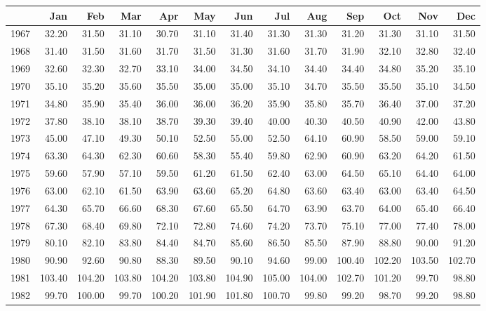 \begin{longtable}{rrrrrrrrrrrrr}
  \hline
 & Jan & Feb & Mar & Apr & May & Jun & Jul & Aug & Sep & Oct & Nov & Dec \\ 
  \hline
1967 & 32.20 & 31.50 & 31.10 & 30.70 & 31.10 & 31.40 & 31.30 & 31.30 & 31.20 & 31.30 & 31.10 & 31.50 \\ 
  1968 & 31.40 & 31.50 & 31.60 & 31.70 & 31.50 & 31.30 & 31.60 & 31.70 & 31.90 & 32.10 & 32.80 & 32.40 \\ 
  1969 & 32.60 & 32.30 & 32.70 & 33.10 & 34.00 & 34.50 & 34.10 & 34.40 & 34.40 & 34.80 & 35.20 & 35.10 \\ 
  1970 & 35.10 & 35.20 & 35.60 & 35.50 & 35.00 & 35.00 & 35.10 & 34.70 & 35.50 & 35.50 & 35.10 & 34.50 \\ 
  1971 & 34.80 & 35.90 & 35.40 & 36.00 & 36.00 & 36.20 & 35.90 & 35.80 & 35.70 & 36.40 & 37.00 & 37.20 \\ 
  1972 & 37.80 & 38.10 & 38.10 & 38.70 & 39.30 & 39.40 & 40.00 & 40.30 & 40.50 & 40.90 & 42.00 & 43.80 \\ 
  1973 & 45.00 & 47.10 & 49.30 & 50.10 & 52.50 & 55.00 & 52.50 & 64.10 & 60.90 & 58.50 & 59.00 & 59.10 \\ 
  1974 & 63.30 & 64.30 & 62.30 & 60.60 & 58.30 & 55.40 & 59.80 & 62.90 & 60.90 & 63.20 & 64.20 & 61.50 \\ 
  1975 & 59.60 & 57.90 & 57.10 & 59.50 & 61.20 & 61.50 & 62.40 & 63.00 & 64.50 & 65.10 & 64.40 & 64.00 \\ 
  1976 & 63.00 & 62.10 & 61.50 & 63.90 & 63.60 & 65.20 & 64.80 & 63.60 & 63.40 & 63.00 & 63.40 & 64.50 \\ 
  1977 & 64.30 & 65.70 & 66.60 & 68.30 & 67.60 & 65.50 & 64.70 & 63.90 & 63.70 & 64.00 & 65.40 & 66.40 \\ 
  1978 & 67.30 & 68.40 & 69.80 & 72.10 & 72.80 & 74.60 & 74.20 & 73.70 & 75.10 & 77.00 & 77.40 & 78.00 \\ 
  1979 & 80.10 & 82.10 & 83.80 & 84.40 & 84.70 & 85.60 & 86.50 & 85.50 & 87.90 & 88.80 & 90.00 & 91.20 \\ 
  1980 & 90.90 & 92.60 & 90.80 & 88.30 & 89.50 & 90.10 & 94.60 & 99.00 & 100.40 & 102.20 & 103.50 & 102.70 \\ 
  1981 & 103.40 & 104.20 & 103.80 & 104.20 & 103.80 & 104.90 & 105.00 & 104.00 & 102.70 & 101.20 & 99.70 & 98.80 \\ 
  1982 & 99.70 & 100.00 & 99.70 & 100.20 & 101.90 & 101.80 & 100.70 & 99.80 & 99.20 & 98.70 & 99.20 & 98.80 \\ 

\end{longtable}
